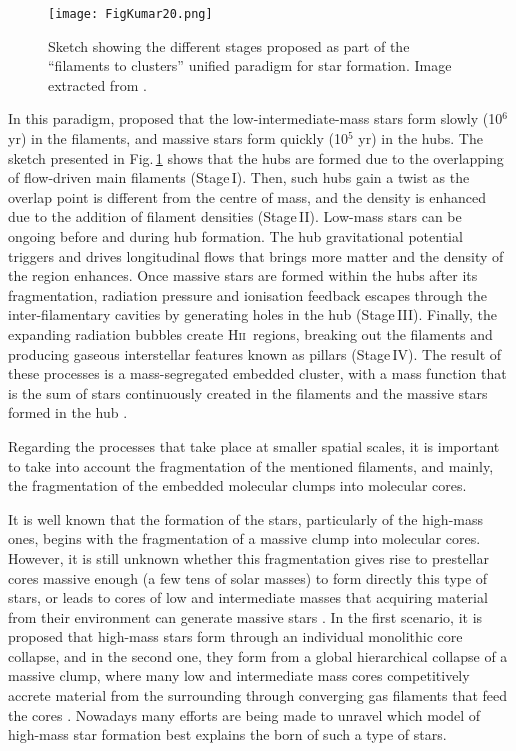 \documentclass[baaa]{baaa}
\newcommand{\hii}{H\textsc{ii}}
\begin{document}
\begin{figure}[h]
\centering
\texttt{[image: FigKumar20.png]}
\caption{Sketch showing the different stages proposed as part of the ``filaments to clusters'' unified paradigm for star formation. 
Image extracted from \citet{kumar20}. }
\label{fil}
\end{figure}



In this paradigm, \citet{kumar20} proposed that the
low-intermediate-mass stars form slowly (10$^{6}$ yr) in the filaments, and massive stars form quickly (10$^{5}$ yr) in the hubs.
The sketch presented in Fig.\,\ref{fil} shows that the hubs are formed due to the overlapping of flow-driven main filaments (Stage\,I). Then, such hubs gain a
twist as the overlap point is different from the centre of mass, and the density is enhanced due to the addition of filament densities (Stage\,II). Low-mass stars
can be ongoing before and during hub formation. The hub gravitational potential triggers and drives longitudinal flows that brings more matter
and the density of the region enhances. 
Once massive stars are formed within the hubs after its fragmentation, radiation pressure and ionisation feedback
escapes through the inter-filamentary cavities by generating holes in the hub (Stage\,III). Finally, the expanding radiation bubbles create \hii~regions, 
breaking out the filaments and producing gaseous interstellar features known as pillars (Stage\,IV). The result of these processes is a
mass-segregated embedded cluster, with a mass function that is the sum of stars continuously created in the filaments and the massive stars formed in the hub \citep{kumar20}.

Regarding the processes that take place at smaller spatial scales, it is important to take into account the fragmentation of the mentioned filaments, and mainly, 
the fragmentation of the embedded molecular clumps into molecular cores. 

It is well known that the formation of the stars, particularly of the high-mass ones, begins with the fragmentation of a massive clump into molecular cores. However, it is still unknown whether this fragmentation gives rise to prestellar cores massive enough (a few tens of solar masses) to form directly this type of stars, or leads to cores of low and intermediate masses that acquiring material from their environment can generate massive stars \citep{palau2018,moscadelli2021}. In the first scenario, it is proposed that high-mass stars form through an individual monolithic core collapse, and in the second one, they form from a global hierarchical collapse of a massive clump, where many low and intermediate mass cores competitively accrete material from the surrounding through converging gas filaments that feed the cores \citep{motte18,sch19,vazquez2019}. Nowadays many efforts are being made to unravel which model of high-mass star formation best explains the born of such a type of stars. 
\end{document}
